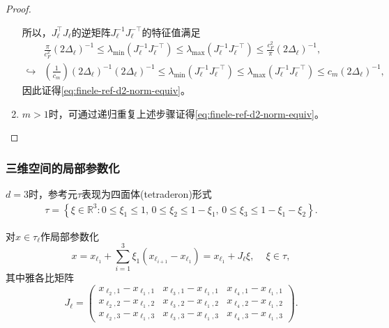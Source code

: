 \begin{proof}
\begin{enumerate}
所以，$J_{\ell}^{\top} J_{\ell}$的逆矩阵$J_{\ell}^{-1} J_{\ell}^{-\top}$的特征值满足
\begin{equation*}
  \begin{split}
    &\frac{\pi}{c_{F}^{2}} \left( 2 \Delta_{\ell} \right)^{-1}
    \le \lambda_{\min} \left( J_{\ell}^{-1} J_{\ell}^{-\top} \right)
    \le \lambda_{\max} \left( J_{\ell}^{-1} J_{\ell}^{-\top} \right)
    \le \frac{c_{F}^{2}}{\pi} \left( 2 \Delta_{\ell} \right)^{-1}, \\
    \hookrightarrow &
    \left( \frac{1}{c_{m}} \right) \left( 2 \Delta_{\ell} \right)^{-1}  \left( 2 \Delta_{\ell} \right)^{-1}
    \le \lambda_{\min} \left( J_{\ell}^{-1} J_{\ell}^{-\top} \right)
    \le \lambda_{\max} \left( J_{\ell}^{-1} J_{\ell}^{-\top} \right)
    \le c_{m} \left( 2 \Delta_{\ell} \right)^{-1},
  \end{split}
\end{equation*}
因此证得\eqref{eq:finele-ref-d2-norm-equiv}。

\item $m>1$时，可通过递归重复上述步骤证得\eqref{eq:finele-ref-d2-norm-equiv}。
\end{enumerate}
\end{proof}

\subsubsection{三维空间的局部参数化}
$d=3$时，参考元$\tau$表现为四面体(tetraderon)形式
\begin{equation*}
  \begin{split}
    \tau = \left\{
    \xi \in \mathbb{R}^{3} :
    0 \le \xi_{1} \le 1, \,
    0 \le \xi_{2} \le 1 - \xi_{1}, \,
    0 \le \xi_{3} \le 1 - \xi_{1} - \xi_{2}
    \right\}.
  \end{split}
\end{equation*}

对$x \in \tau_{\ell}$作局部参数化
\begin{equation*}
  x = x_{\ell_{1}} + \sum_{i=1}^{3} \xi_{1} \left( x_{\ell_{i+1}} - x_{\ell_{1}} \right)
  = x_{\ell_{1}} + J_{\ell} \xi, \quad \, \xi \in \tau,
\end{equation*}
其中雅各比矩阵
\begin{equation*}
  J_{\ell} =
  \begin{pmatrix}
    x_{\ell_{2},1} - x_{\ell_{1},1} &
    x_{\ell_{3},1} - x_{\ell_{1},1} &
    x_{\ell_{4},1} - x_{\ell_{1},1} \\
    x_{\ell_{2},2} - x_{\ell_{1},2} &
    x_{\ell_{3},2} - x_{\ell_{1},2} &
    x_{\ell_{4},2} - x_{\ell_{1},2} \\
    x_{\ell_{2},3} - x_{\ell_{1},3} &
    x_{\ell_{3},3} - x_{\ell_{1},3} &
    x_{\ell_{4},3} - x_{\ell_{1},3}
  \end{pmatrix}.
\end{equation*}

